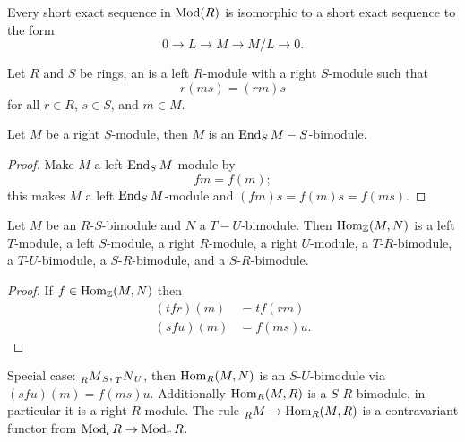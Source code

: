   Every short exact sequence in $\operatorname{Mod}(R)$ is isomorphic to a short exact
  sequence to the form
  \[ 0 \to L \to M \to M/L \to 0. \]

  \begin{define}
    Let $R$ and $S$ be rings, an  is a left $R$-module
    with a right $S$-module such that
    \[ r(ms) = (rm)s \]
    for all $r\in R$, $s\in S$, and $m\in M$.
  \end{define}

  \begin{lemma}
    Let $M$ be a right $S$-module, then $M$ is an $\operatorname{End}_S{M}-S$-bimodule.
  \end{lemma}
  \begin{proof}
    Make $M$ a left $\operatorname{End}_S{M}$-module by
    \[ fm = f(m); \]
    this makes $M$ a left $\operatorname{End}_S{M}$-module and $(fm)s = f(m)s = f(ms)$.
  \end{proof}

  \begin{prop}
    Let $M$ be an $R$-$S$-bimodule and $N$ a $T-U$-bimodule. Then
    $\operatorname{Hom}_{\mathbb{Z}}(M,N)$ is a left $T$-module, a left $S$-module, a right
    $R$-module, a right $U$-module, a $T$-$R$-bimodule, a $T$-$U$-bimodule, a
    $S$-$R$-bimodule, and a $S$-$R$-bimodule.
  \end{prop}
  \begin{proof}
    If $f\in \operatorname{Hom}_{\mathbb{Z}}(M,N)$ then
    \begin{align*}
      (tfr)(m) &= tf(rm) \\
      (sfu)(m) &= f(ms)u.
    \end{align*}
  \end{proof}

  Special case: $\prescript{}{R}{M}_S, \prescript{}{T}{N}_U$, then $\operatorname{Hom}_R(M,N)$ is an
  $S$-$U$-bimodule via $(sfu)(m) = f(ms)u$. Additionally $\operatorname{Hom}_R(M,R)$ is a
  $S$-$R$-bimodule, in particular it is a right $R$-module. The rule
  $\prescript{}{R}{M} \to \operatorname{Hom}_R(M,R)$ is a contravariant functor from
  $\operatorname{Mod}_l R \to \operatorname{Mod}_r R$.

